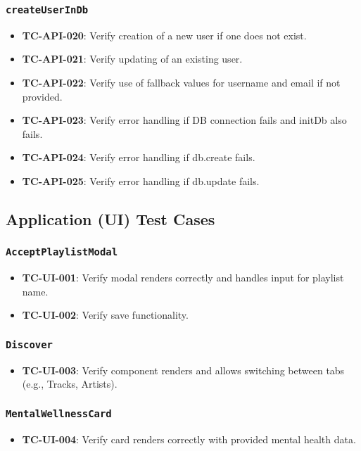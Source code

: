 \documentclass{article}
\begin{document}
\subsubsection{\texttt{createUserInDb}}
\begin{itemize}
    \item \textbf{TC-API-020}: Verify creation of a new user if one does not exist.
    \item \textbf{TC-API-021}: Verify updating of an existing user.
    \item \textbf{TC-API-022}: Verify use of fallback values for username and email if not provided.
    \item \textbf{TC-API-023}: Verify error handling if DB connection fails and initDb also fails.
    \item \textbf{TC-API-024}: Verify error handling if db.create fails.
    \item \textbf{TC-API-025}: Verify error handling if db.update fails.
\end{itemize}

\subsection{Application (UI) Test Cases}

\subsubsection{\texttt{AcceptPlaylistModal}}
\begin{itemize}
    \item \textbf{TC-UI-001}: Verify modal renders correctly and handles input for playlist name.
    \item \textbf{TC-UI-002}: Verify save functionality.
\end{itemize}

\subsubsection{\texttt{Discover}}
\begin{itemize}
    \item \textbf{TC-UI-003}: Verify component renders and allows switching between tabs (e.g., Tracks, Artists).
\end{itemize}

\subsubsection{\texttt{MentalWellnessCard}}
\begin{itemize}
    \item \textbf{TC-UI-004}: Verify card renders correctly with provided mental health data.
\end{itemize}
\end{document}
